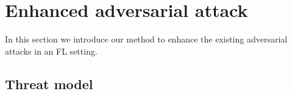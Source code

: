 \section{Enhanced adversarial attack }
\label{sec:ourattack}
In this section we introduce our method to enhance the existing adversarial attacks in an FL setting.

\subsection{Threat model}







